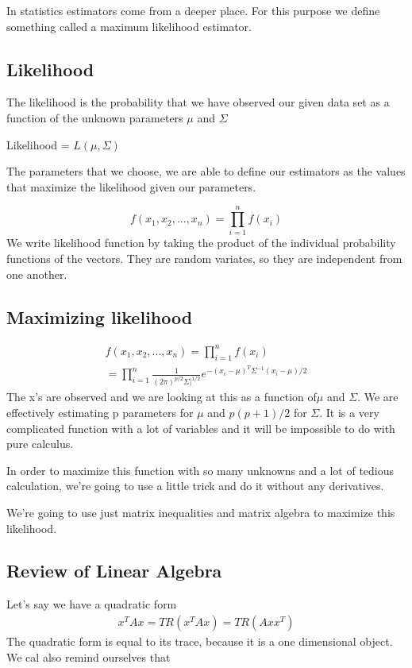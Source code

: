 In statistics estimators come from a deeper place. For this purpose we define something called a maximum likelihood estimator.

\subsection{Likelihood}
The likelihood is the probability that we have observed our given data set as a function of the unknown parameters $\mu$ and $\Sigma$

Likelihood = $L(\mu,\Sigma)$

The parameters that we choose, we are able to define our estimators as the values that maximize the likelihood given our parameters.

\[f(x_1,x_2,...,x_n) = \displaystyle\prod_{i=1}^{n}f(x_i)\]
We write likelihood function by taking the product of the individual probability functions of the vectors. They are random variates, so they are independent from one another.

\subsection{Maximizing likelihood}

\begin{gather*}
    f(x_1,x_2,...,x_n) = \displaystyle\prod_{i=1}^{n}f(x_i)\\
    =\displaystyle\prod_{i=1}^{n} \frac{1}{(2\pi)^{p/2}\Sigma|^{1/2} 
    }e^{-(x_i-\mu)^T\Sigma^{-1}(x_i-\mu)/2}
\end{gather*}
The x's are observed and we are looking at this as a function of$\mu$ and $\Sigma$. We are effectively estimating p parameters for $\mu$ and $p(p+1)/2$ for $\Sigma$. It is a very complicated function with a lot of variables and it will be  impossible to do with pure calculus.

In order to maximize this function with so many unknowns and a lot of tedious calculation, we're going to use a little trick and do it without any derivatives.

We're going to use just matrix inequalities and matrix algebra to maximize this likelihood.

\subsection{Review of Linear Algebra}
Let's say we have a quadratic form
\begin{gather*}
    x^TAx = TR(x^TAx) = TR(Axx^T)
\end{gather*}
The quadratic form is equal to its trace, because it is a one dimensional object. We cal also remind ourselves that

